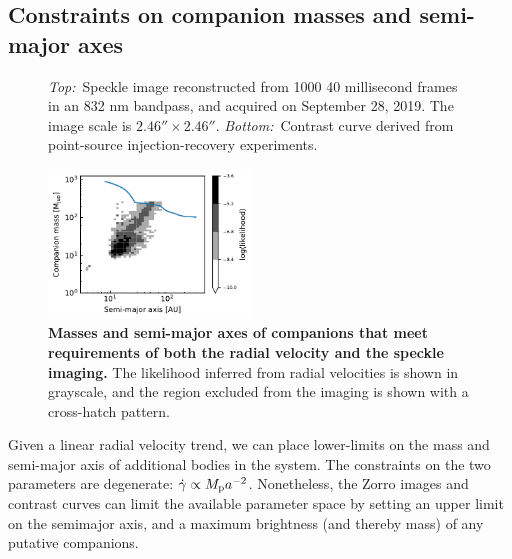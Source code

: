 \documentclass[12pt,twocolumn,tighten]{aastex62}
\begin{document}
\subsection{Constraints on companion masses and semi-major axes}

\begin{figure}[!t]
	\vspace{-1cm}
	\vspace{-0.7cm}
    \caption{
      {\it Top:\,} 
      Speckle image reconstructed from 1000 40 millisecond frames in
      an 832 nm bandpass, and acquired on September 28, 2019.  The
      image scale is $2.46''\times2.46''$.
      {\it Bottom:\,} 
      Contrast curve derived from point-source injection-recovery
      experiments.
    }
    \label{fig:zorro}
\end{figure}

\begin{figure}[t]
	\begin{center}
		\leavevmode
		\includegraphics[width=0.48\textwidth]{f4.pdf}
	\end{center}
	\vspace{-0.7cm}
	\caption{
    {\bf Masses and semi-major axes of companions that meet
    requirements of both the radial velocity and the speckle imaging.}
    The likelihood inferred from radial velocities is shown in
    grayscale, and the region excluded from the imaging is shown with
    a cross-hatch pattern.
	\label{fig:mass_sma}
  \vspace{-0.3cm}
	}
\end{figure}


Given a linear radial velocity trend, we can place lower-limits on the
mass and semi-major axis of additional bodies in the system.  The
constraints on the two parameters are degenerate: $\dot{\gamma}
\propto M_{\rm p} a^{-2}$.  Nonetheless, the Zorro images and contrast
curves can limit the available parameter space by setting an upper
limit on the semimajor axis, and a maximum brightness (and thereby
mass) of any putative companions.
\end{document}
